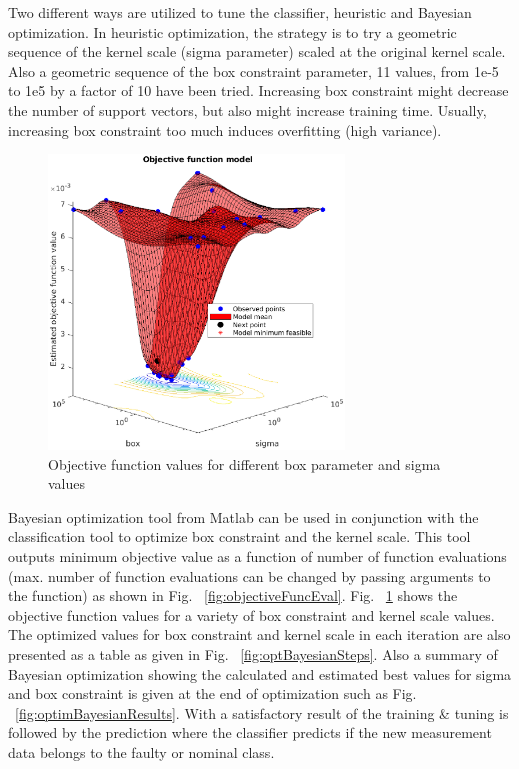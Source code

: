 Two different ways are utilized to tune the classifier, heuristic and Bayesian optimization. In heuristic optimization, the strategy is to try a geometric sequence of the kernel scale (sigma parameter) scaled at the original kernel scale.  
Also a geometric sequence of the box constraint parameter, 11 values, from 1e-5 to 1e5 by a factor of 10 have been tried. Increasing box constraint might decrease the number of support vectors, but also might increase training time. 
Usually, increasing box constraint too much induces overfitting (high variance). 

\begin{figure}
\begin{center}
\includegraphics[width=0.7\textwidth]{figures/objFuncModel}    %
\caption{Objective function values for different box parameter and sigma values} 
\label{fig:objFuncModel}
\end{center}
\end{figure}


Bayesian optimization tool from Matlab can be used in conjunction with the classification tool to optimize box constraint and the kernel scale. 
This tool outputs minimum objective value as a function of number of function evaluations (max. number of function evaluations can be changed by passing arguments to the function) as shown in Fig. ~\ref{fig:objectiveFuncEval}. 
Fig. ~\ref{fig:objFuncModel} shows the objective function values for a variety of box constraint and kernel scale values. 
The optimized values for box constraint and kernel scale in each iteration are also presented as a table as given in Fig. ~\ref{fig:optBayesianSteps}. 
Also a summary of Bayesian optimization showing the calculated and estimated best values for sigma and box constraint is given at the end of optimization such as Fig. ~\ref{fig:optimBayesianResults}.
With a satisfactory result of the training \& tuning is followed by the prediction where the classifier predicts if the new measurement data belongs to the faulty or nominal class. 

